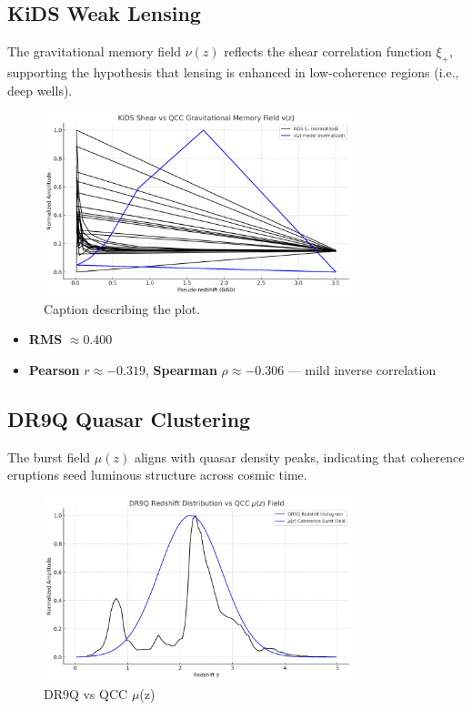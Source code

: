 \documentclass[12pt]{article}
\begin{document}
	\subsection*{KiDS Weak Lensing}
	The gravitational memory field \( \nu(z) \) reflects the shear correlation function \( \xi_+ \), supporting the hypothesis that lensing is enhanced in low-coherence regions (i.e., deep wells).
	
	\begin{figure}[htbp]
		\centering
		\includegraphics[width=0.8\textwidth]{KiDSvsQCCwells.png} 
		\caption{Caption describing the plot.}
		\label{fig:KiDSvsQCCwells}
	\end{figure}
	
	\begin{itemize}
		\item \textbf{RMS} $\approx 0.400$
		\item \textbf{Pearson} \( r \approx -0.319 \), \textbf{Spearman} \( \rho \approx -0.306 \) — mild inverse correlation
	\end{itemize}
	
	\newpage
	
	\subsection*{DR9Q Quasar Clustering}
	The burst field \( \mu(z) \) aligns with quasar density peaks, indicating that coherence eruptions seed luminous structure across cosmic time.
	
	\begin{figure}[htbp]
		\centering
		\includegraphics[width=0.8\textwidth]{DR9QvsQCCwells.png}
		\caption{DR9Q vs QCC $\mu$(z)}
		\label{fig:DR9QvsQCCBurst}
	\end{figure}
	
\end{document}
